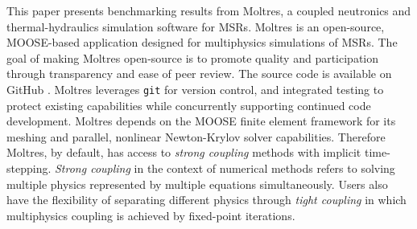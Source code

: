 
This paper presents benchmarking results from Moltres, a coupled
neutronics and thermal-hydraulics simulation software for \glspl{MSR}. Moltres
is an open-source, \gls{MOOSE}-based application designed for multiphysics
simulations of \glspl{MSR}. The goal of making Moltres open-source is to
promote quality and participation through transparency and
ease of peer review. The source code \citep{lindsay_moltres_2017} is available
on GitHub \citep{github_build_2017}. Moltres leverages \texttt{git} for
version control, and integrated testing to protect existing capabilities while
concurrently supporting continued code development. Moltres depends on the
\gls{MOOSE} finite element framework for its meshing and parallel, nonlinear
Newton-Krylov solver capabilities. Therefore Moltres, by default, has access to
\textit{strong coupling} methods with implicit time-stepping.
\textit{Strong coupling} in the context of numerical methods refers to
solving multiple physics represented by multiple equations simultaneously.
Users also have the flexibility of separating different physics through
\textit{tight coupling} in which multiphysics coupling is achieved by
fixed-point iterations.


